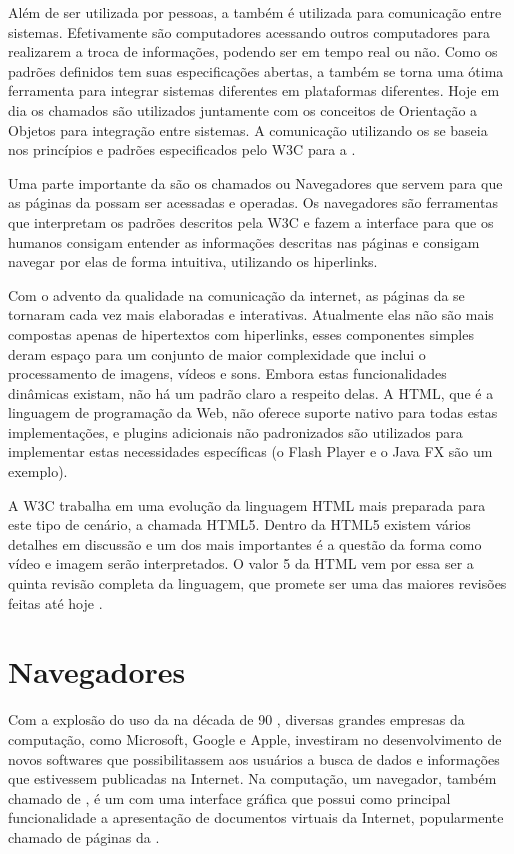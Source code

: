 \documentclass[espaco=simples,appendix=Name]{abnt}
\begin{document}
Além de ser utilizada por pessoas, a  também é utilizada para comunicação entre sistemas. Efetivamente são computadores acessando outros computadores para realizarem a troca de informações, podendo ser em tempo real ou não. Como os padrões definidos tem suas especificações abertas, a  também se torna uma ótima ferramenta para integrar sistemas diferentes em plataformas diferentes. Hoje em dia os chamados  são utilizados juntamente com os conceitos de Orientação a Objetos para integração entre sistemas. A comunicação utilizando os  se baseia nos princípios e padrões especificados pelo W3C para a  \cite{WebServices}.

Uma parte importante da  são os chamados  ou Navegadores que servem para que as páginas da  possam ser acessadas e operadas. Os navegadores são ferramentas que interpretam os padrões descritos pela W3C e fazem a interface para que os humanos consigam entender as informações descritas nas páginas e consigam navegar por elas de forma intuitiva, utilizando os hiperlinks.

Com o advento da qualidade na comunicação da internet, as páginas da  se tornaram cada vez mais elaboradas e interativas. Atualmente elas não são mais compostas apenas de hipertextos com hiperlinks, esses componentes simples deram espaço para um conjunto de maior complexidade que inclui o processamento de imagens, vídeos e sons. Embora estas funcionalidades dinâmicas existam, não há um padrão claro a respeito delas. A HTML, que é a linguagem de programação da Web, não oferece suporte nativo para todas estas implementações, e plugins adicionais não padronizados são utilizados para implementar estas necessidades específicas (o Flash Player e o Java FX são um exemplo).

A W3C trabalha em uma evolução da linguagem HTML mais preparada para este tipo de cenário, a chamada HTML5. Dentro da HTML5 existem vários detalhes em discussão e um dos mais importantes é a questão da forma como vídeo e imagem serão interpretados. O valor 5 da HTML vem por essa ser a quinta revisão completa da linguagem, que promete ser uma das maiores revisões feitas até hoje \cite{HTML5spec}.


\section{Navegadores}

Com a explosão do uso da  na década de 90 \cite{BloombergGameChangers}, diversas grandes empresas da computação, como Microsoft, Google e Apple, investiram no desenvolvimento de novos softwares que possibilitassem aos usuários a busca de dados e informações que estivessem publicadas na Internet. Na computação, um navegador, também chamado de , é um  com uma interface gráfica que possui como principal funcionalidade a apresentação de documentos virtuais da Internet, popularmente chamado de páginas da .
\end{document}
